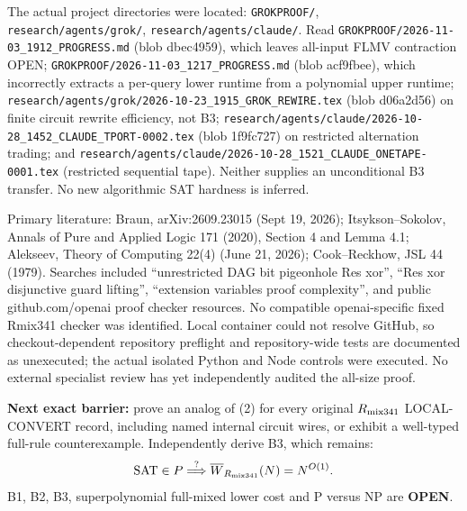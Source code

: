 \documentclass[11pt]{article}
\begin{document}
The actual project directories were located: \texttt{GROKPROOF/}, \texttt{research/agents/grok/}, \texttt{research/agents/claude/}. Read \texttt{GROKPROOF/2026-11-03\_1912\_PROGRESS.md} (blob dbec4959), which leaves all-input FLMV contraction OPEN; \texttt{GROKPROOF/2026-11-03\_1217\_PROGRESS.md} (blob acf9fbee), which incorrectly extracts a per-query lower runtime from a polynomial upper runtime; \texttt{research/agents/grok/2026-10-23\_1915\_GROK\_REWIRE.tex} (blob d06a2d56) on finite circuit rewrite efficiency, not B3; \texttt{research/agents/claude/2026-10-28\_1452\_CLAUDE\_TPORT-0002.tex} (blob 1f9fc727) on restricted alternation trading; and \texttt{research/agents/claude/2026-10-28\_1521\_CLAUDE\_ONETAPE-0001.tex} (restricted sequential tape). Neither supplies an unconditional B3 transfer. No new algorithmic SAT hardness is inferred.

Primary literature: Braun, arXiv:2609.23015 (Sept 19, 2026); Itsykson--Sokolov, Annals of Pure and Applied Logic 171 (2020), Section 4 and Lemma 4.1; Alekseev, Theory of Computing 22(4) (June 21, 2026); Cook--Reckhow, JSL 44 (1979). Searches included ``unrestricted DAG bit pigeonhole Res xor'', ``Res xor disjunctive guard lifting'', ``extension variables proof complexity'', and public github.com/openai proof checker resources. No compatible openai-specific fixed Rmix341 checker was identified. Local container could not resolve GitHub, so checkout-dependent repository preflight and repository-wide tests are documented as unexecuted; the actual isolated Python and Node controls were executed. No external specialist review has yet independently audited the all-size proof.

\textbf{Next exact barrier:} prove an analog of (2) for every original $R_{\rm mix341}$ LOCAL-CONVERT record, including named internal circuit wires, or exhibit a well-typed full-rule counterexample. Independently derive B3, which remains:
\[
\mathrm{SAT}\in P\stackrel{?}{\Longrightarrow}
\overline W_{R_{\rm mix341}}(N)=N^{O(1)}.
\]
B1, B2, B3, superpolynomial full-mixed lower cost and P versus NP are \textbf{OPEN}.


\end{document}
